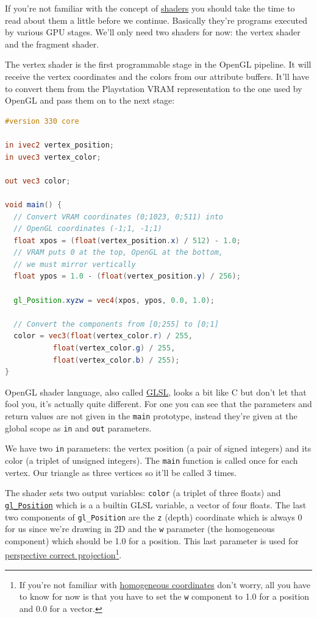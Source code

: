 \documentclass[a4paper]{article}
\newcommand{\code}[1] {\texttt{#1}}
\begin{document}
If you're not familiar with the concept of
\href{https://en.wikipedia.org/wiki/Shader}{shaders} you should take
the time to read about them a little before we continue. Basically
they're programs executed by various GPU stages. We'll only need two
shaders for now: the vertex shader and the fragment shader.

The vertex shader is the first programmable stage in the OpenGL
pipeline. It will receive the vertex coordinates and the colors from
our attribute buffers. It'll have to convert them from the Playstation
VRAM representation to the one used by OpenGL and pass them on to the
next stage:

\begin{lstlisting}[language=glsl]
#version 330 core

in ivec2 vertex_position;
in uvec3 vertex_color;

out vec3 color;

void main() {
  // Convert VRAM coordinates (0;1023, 0;511) into
  // OpenGL coordinates (-1;1, -1;1)
  float xpos = (float(vertex_position.x) / 512) - 1.0;
  // VRAM puts 0 at the top, OpenGL at the bottom,
  // we must mirror vertically
  float ypos = 1.0 - (float(vertex_position.y) / 256);

  gl_Position.xyzw = vec4(xpos, ypos, 0.0, 1.0);

  // Convert the components from [0;255] to [0;1]
  color = vec3(float(vertex_color.r) / 255,
	       float(vertex_color.g) / 255,
	       float(vertex_color.b) / 255);
}
\end{lstlisting}

OpenGL shader language, also called
\href{https://en.wikipedia.org/wiki/OpenGL_Shading_Language}{GLSL},
looks a bit like C but don't let that fool you, it's actually quite
different. For one you can see that the parameters and return values
are not given in the \code{main} prototype, instead they're given at
the global scope as \code{in} and \code{out} parameters.

We have two \code{in} parameters: the vertex position (a pair of
signed integers) and its color (a triplet of unsigned integers). The
\code{main} function is called once for each vertex. Our triangle as
three vertices so it'll be called 3 times.

The shader sets two output variables: \code{color} (a triplet of three
floats) and
\href{https://www.opengl.org/sdk/docs/man4/html/gl_Position.xhtml}{\code{gl\_Position}}
which is a a builtin GLSL variable, a vector of four floats. The last
two components of \code{gl\_Position} are the \code{z} (depth)
coordinate which is always 0 for us since we're drawing in 2D and the
\code{w} parameter (the homogeneous component) which should be 1.0 for
a position. This last parameter is used for
\href{https://en.wikipedia.org/wiki/Transformation_matrix#Perspective_projection}{perspective
  correct projection}\footnote{If you're not familiar with
  \href{https://en.wikipedia.org/wiki/Homogeneous_coordinates}{homogeneous
    coordinates} don't worry, all you have to know for now is that you
  have to set the \code{w} component to 1.0 for a position and 0.0 for
  a vector.}.
\end{document}
